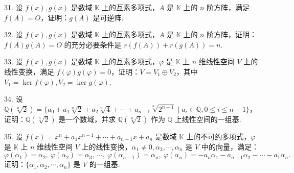 \documentclass[UTF8,12pt,a4paper,fontset=fandol]{ctexart}
\begin{document}
31. 设 $f(x),g(x)$ 是数域 $\mathbb{K}$ 上的互素多项式，$A$ 是 $\mathbb{K}$ 上的 $n$ 阶方阵，满足 $f(A)=O$，证明：$g(A)$ 是可逆阵.

32. 设 $f(x),g(x)$ 是数域 $\mathbb{K}$ 上的互素多项式，$A$ 是 $\mathbb{K}$ 上的 $n$ 阶方阵，证明：$f(A)g(A)=O$ 的充分必要条件是 $r(f(A))+r(g(A))=n$.

33. 设 $f(x),g(x)$ 是数域 $\mathbb{K}$ 上的互素多项式，$\varphi$ 是 $\mathbb{K}$ 上 $n$ 维线性空间 $V$ 上的线性变换，满足 $f(\varphi)g(\varphi)=0$，证明：$V=V_1\oplus V_2$，其中 $V_1=\ker f(\varphi),V_2=\ker g(\varphi)$.

34. 设 $\mathbb{Q}(\sqrt[n]{2})=\{a_0+a_1\sqrt[n]{2}+a_2\sqrt[n]{4}+\cdots+a_{n-1}\sqrt[n]{2^{n-1}}\mid a_i\in\mathbb{Q},0\leq i\leq n-1\}$，证明：$\mathbb{Q}(\sqrt[n]{2})$ 是一个数域，并求 $\mathbb{Q}(\sqrt[n]{2})$ 作为 $\mathbb{Q}$ 上线性空间的一组基.

35. 设 $f(x)=x^n+a_1x^{n-1}+\cdots+a_{n-1}x+a_n$ 是数域 $\mathbb{K}$ 上的不可约多项式，$\varphi$ 是 $\mathbb{K}$ 上 $n$ 维线性空间 $V$ 上的线性变换，$\alpha_1\neq 0,\alpha_2,\cdots,\alpha_n$ 是 $V$ 中的向量，满足：
\[
\varphi(\alpha_1)=\alpha_2,\ \varphi(\alpha_2)=\alpha_3,\ \cdots,\ \varphi(\alpha_{n-1})=\alpha_n,\ \varphi(\alpha_n)=-a_n\alpha_1-a_{n-1}\alpha_2-\cdots-a_1\alpha_n.
\]
证明：$\{\alpha_1,\alpha_2,\cdots,\alpha_n\}$ 是 $V$ 的一组基.
\end{document}
